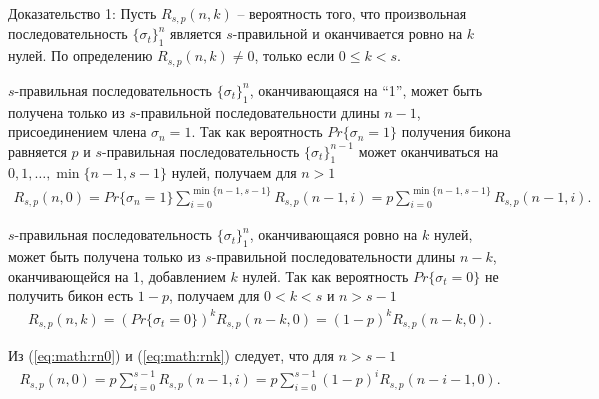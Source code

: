 Доказательство 1:
Пусть $R_{s,p}(n,k)$ -- вероятность того, что произвольная последовательность $\{\sigma_t\}_1^n$ является $s$-правильной и оканчивается ровно на $k$ нулей. По определению $R_{s,p}(n,k) \neq 0$, только если $0 \leq k < s$.

$s$-правильная последовательность $\{\sigma_t\}_1^n$, оканчивающаяся на ``1'', может быть получена только из $s$-правильной последовательности длины $n-1$, присоединением члена $\sigma_n=1$. Так как вероятность $Pr\{\sigma_n=1\}$ получения бикона равняется $p$ и $s$-правильная последовательность  $\{\sigma_t\}_1^{n-1}$ может оканчиваться на $0, 1, \ldots, \min\{n-1,s-1\}$ нулей, получаем для $n>1$
\begin{equation}
\label{eq:math:rn0}
\begin{array}{c}
 R_{s,p}(n,0) = Pr\{\sigma_n=1\} \sum \limits^{\min\{n-1,s-1\}}_{i=0} R_{s,p}(n-1,i) =p \sum \limits^{\min\{n-1,s-1\}}_{i=0} R_{s,p}(n-1,i).
\end{array}
\end{equation}

$s$-правильная последовательность $\{\sigma_t\}_1^n$, оканчивающаяся ровно на $k$ нулей, может быть получена только из $s$-правильной последовательности длины $n-k$, оканчивающейся на 1, добавлением $k$ нулей. Так как вероятность $Pr\{\sigma_t=0\}$ не получить бикон есть $1-p$, получаем для $0<k<s$ и $n > s-1$
\begin{equation}
\begin{array}{c}
\label{eq:math:rnk}
R_{s,p}(n,k) = (Pr\{\sigma_t=0\})^k R_{s,p}(n-k,0) =(1-p)^k R_{s,p}(n-k,0).
\end{array}
\end{equation}

Из (\ref{eq:math:rn0}) и (\ref{eq:math:rnk}) следует, что для $n > s-1$
\[
\begin{array}{c}
R_{s,p}(n,0) = p \sum \limits^{s-1}_{i=0} R_{s,p}(n-1,i)= p \sum \limits^{s-1}_{i=0} (1-p)^i R_{s,p}(n-i-1,0).
\end{array}
\]


